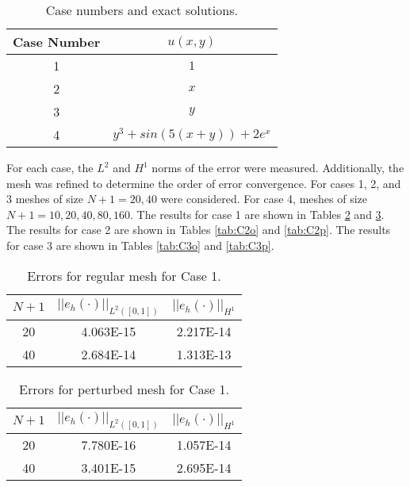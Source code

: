 \documentclass[a4paper, 12pt]{article}
\begin{document}
\begin{table}[!ht]
\caption{ Case numbers and exact solutions.}
\vspace{0.1in}
\centering
\begin{tabular}{ |c|c|}
  \hline
  Case Number  & $u( x,y)$ \\
  \hline
  1            &  $1$ \\
  \hline
  2            &  $x$ \\
  \hline
  3            &  $y$ \\
  \hline
  4            &  $y^3 + sin( 5(x+y)) + 2e^x$ \\
  \hline
\end{tabular}
\label{t:cases}
\end{table}

\noindent
For each case, the $L^2$ and $H^1$ norms of the error were measured. 
Additionally, the mesh was refined to determine the order of 
error convergence. For cases 1, 2, and 3 meshes of size $N+1 = 20, 40$
were considered. For case 4, meshes of size $N+1 = 10, 20, 40, 80, 160$.
The results for case 1 are shown in Tables \ref{tab:C1o}
and \ref{tab:C1p}.
The results for case 2 are shown in Tables \ref{tab:C2o}
and \ref{tab:C2p}.
The results for case 3 are shown in Tables \ref{tab:C3o}
and \ref{tab:C3p}.

\begin{table}[!ht]
\caption{Errors for regular mesh for Case 1.}
\vspace{0.1in}
\centering
\begin{tabular}{|c|c|c|}
\hline
 $N+1$&  $||e_h(\cdot)||_{L^2([0,1])}$ & $||e_h(\cdot)||_{H^1}$ \\
 \hline
     20  & 4.063E-15 & 2.217E-14 \\
     40  & 2.684E-14 & 1.313E-13 \\
\hline
\end{tabular}
\label{tab:C1o}
\end{table}

\begin{table}[!ht]
\caption{Errors for perturbed mesh for Case 1.}
\vspace{0.1in}
\centering
\begin{tabular}{|c|c|c|}
\hline
 $N+1$  & $||e_h(\cdot)||_{L^2([0,1])}$ & $||e_h(\cdot)||_{H^1}$ \\
 \hline
     20  & 7.780E-16 & 1.057E-14 \\
     40  & 3.401E-15 & 2.695E-14 \\
\hline
\end{tabular}
\label{tab:C1p}
\end{table}
\end{document}
